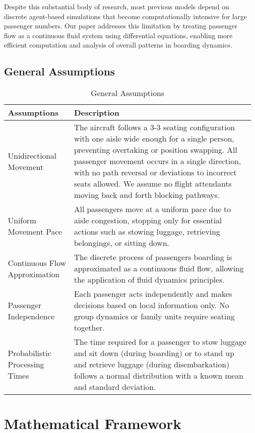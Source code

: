 \documentclass[12pt,a4paper]{article}
\begin{document}
Despite this substantial body of research, most previous models depend on discrete agent-based simulations that become computationally intensive for large passenger numbers. Our paper addresses this limitation by treating passenger flow as a continuous fluid system using differential equations, enabling more efficient computation and analysis of overall patterns in boarding dynamics.

\subsection{General Assumptions}
\begin{table}[H]
\centering
\begin{tabular}{|p{3cm}|p{11cm}|}
\hline
\textbf{Assumptions} & \textbf{Description} \\ \hline
Unidirectional Movement & The aircraft follows a 3-3 seating configuration with one aisle wide enough for a single person, preventing overtaking or position swapping. All passenger movement occurs in a single direction, with no path reversal or deviations to incorrect seats allowed. We assume no flight attendants moving back and forth blocking pathways. \\ \hline
Uniform Movement Pace & All passengers move at a uniform pace due to aisle congestion, stopping only for essential actions such as stowing luggage, retrieving belongings, or sitting down. \\ \hline
Continuous Flow Approximation & The discrete process of passengers boarding is approximated as a continuous fluid flow, allowing the application of fluid dynamics principles. \\ \hline
Passenger Independence & Each passenger acts independently and makes decisions based on local information only. No group dynamics or family units require seating together. \\ \hline
Probabilistic Processing Times & The time required for a passenger to stow luggage and sit down (during boarding) or to stand up and retrieve luggage (during disembarkation) follows a normal distribution with a known mean and standard deviation. \\ \hline
\end{tabular}
\caption{General Assumptions}
\label{tab:assumptions}
\end{table}

\section{Mathematical Framework}
\end{document}
